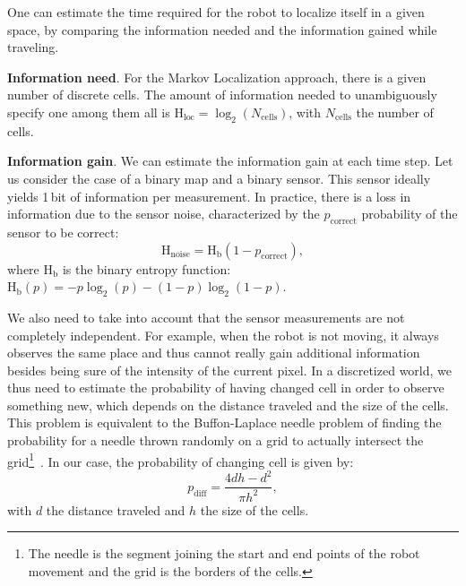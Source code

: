 \documentclass{svmult}
\newcommand{\ent}[1]{\mathrm{H}_\mathrm{#1}} %
\begin{document}
One can estimate the time required for the robot to localize itself in a given space, by comparing the information needed and the information gained while traveling.

\textbf{Information need}. For the Markov Localization approach, there is a given number of discrete cells.
The amount of information needed to unambiguously specify one among them all is $\ent{loc} = \log_2(N_\mathrm{cells})$, with $N_\mathrm{cells}$ the number of cells.

\textbf{Information gain}.
We can estimate the information gain at each time step.
Let us consider the case of a binary map and a binary sensor.
This sensor ideally yields 1\,bit of information per measurement.
In practice, there is a loss in information due to the sensor noise, characterized by the $p_\mathrm{correct}$ probability of the sensor to be correct:
\begin{equation} \label{eq:H_noise}
	\ent{noise} = \ent{b}(1 - p_\mathrm{correct}),
\end{equation}
where $\ent{b}$ is the binary entropy function: $\ent{b}(p) = -p\log_2(p) - (1-p)\log_2(1-p)$.

We also need to take into account that the sensor measurements are not completely independent.
For example, when the robot is not moving, it always observes the same place and thus cannot really gain additional information besides being sure of the intensity of the current pixel.
In a discretized world, we thus need to estimate the probability of having changed cell in order to observe something new, which depends on the distance traveled and the size of the cells.
This problem is equivalent to the Buffon-Laplace needle problem of finding the probability for a needle thrown randomly on a grid to actually intersect the grid\footnote{The needle is the segment joining the start and end points of the robot movement and the grid is the borders of the cells.}~\cite{laplace1820prob}.
In our case, the probability of changing cell is given by:
\begin{equation} \label{eq:p_diff}
	p_\mathrm{diff} = \frac{4d h - d^2}{\pi h^2},
\end{equation}
with $d$ the distance traveled and $h$ the size of the cells.
\end{document}
